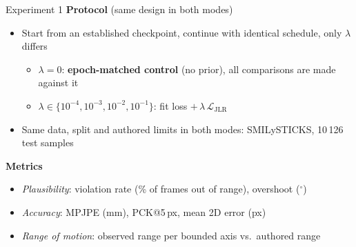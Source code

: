 \documentclass[aspectratio=169,11pt]{beamer}
\begin{document}
\begin{frame}{Experiment 1}
  \textbf{Protocol} {\small (same design in both modes)}
  \begin{itemize}\setlength\itemsep{0.3em}
    \item {\small Start from an established checkpoint, continue with
      identical schedule,  only \(\lambda\) differs}
      \begin{itemize}
        \item {\small \(\lambda = 0\): \textbf{epoch-matched control}
          (no prior), all comparisons are made against it}
        \item {\small \(\lambda \in \{10^{-4}, 10^{-3}, 10^{-2}, 10^{-1}\}\):
          fit loss \(+\,\lambda\,\mathcal{L}_{\mathrm{JLR}}\)}
      \end{itemize}
    \item {\small Same data, split and authored limits in both modes:
      SMILySTICKS, 10\,126 test samples}
  \end{itemize}

  \textbf{Metrics}
  \begin{itemize}\setlength\itemsep{0.2em}
    \item {\small \emph{Plausibility}: violation rate (\% of frames out of
      range), overshoot (\(^\circ\))}
    \item {\small \emph{Accuracy}: MPJPE (mm), PCK@5\,px, mean 2D error (px)}
    \item {\small \emph{Range of motion}: observed range per bounded axis
      vs.\ authored range}
  \end{itemize}
\end{frame}
\end{document}
